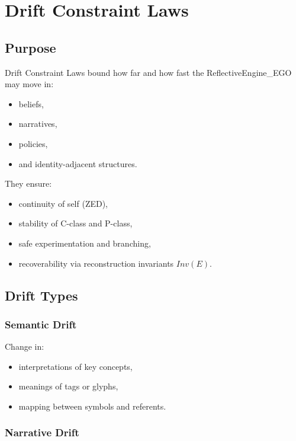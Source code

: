 \chapter{Drift Constraint Laws}
\label{chap:Drift_Constraint_Laws}

\section{Purpose}

Drift Constraint Laws bound how far and how fast the ReflectiveEngine\_EGO
may move in:
\begin{itemize}
    \item beliefs,
    \item narratives,
    \item policies,
    \item and identity-adjacent structures.
\end{itemize}

They ensure:
\begin{itemize}
    \item continuity of self (ZED),
    \item stability of C-class and P-class,
    \item safe experimentation and branching,
    \item recoverability via reconstruction invariants $Inv(E)$.
\end{itemize}

\section{Drift Types}

\subsection{Semantic Drift}

Change in:
\begin{itemize}
    \item interpretations of key concepts,
    \item meanings of tags or glyphs,
    \item mapping between symbols and referents.
\end{itemize}

\subsection{Narrative Drift}

